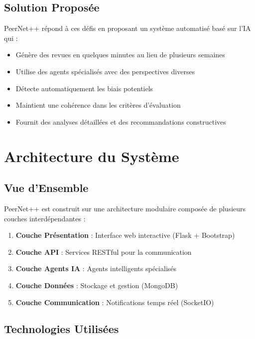 \documentclass[12pt,a4paper]{article}
\begin{document}
\subsection{Solution Proposée}

PeerNet++ répond à ces défis en proposant un système automatisé basé sur l'IA qui :
\begin{itemize}
    \item Génère des revues en quelques minutes au lieu de plusieurs semaines
    \item Utilise des agents spécialisés avec des perspectives diverses
    \item Détecte automatiquement les biais potentiels
    \item Maintient une cohérence dans les critères d'évaluation
    \item Fournit des analyses détaillées et des recommandations constructives
\end{itemize}

\section{Architecture du Système}

\subsection{Vue d'Ensemble}

PeerNet++ est construit sur une architecture modulaire composée de plusieurs couches interdépendantes :

\begin{tcolorbox}[colback=primaryblue!5,colframe=primaryblue,title=Couches Principales]
\begin{enumerate}
    \item \textbf{Couche Présentation} : Interface web interactive (Flask + Bootstrap)
    \item \textbf{Couche API} : Services RESTful pour la communication
    \item \textbf{Couche Agents IA} : Agents intelligents spécialisés
    \item \textbf{Couche Données} : Stockage et gestion (MongoDB)
    \item \textbf{Couche Communication} : Notifications temps réel (SocketIO)
\end{enumerate}
\end{tcolorbox}

\subsection{Technologies Utilisées}
\end{document}
